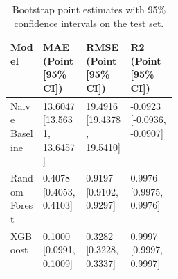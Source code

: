 \begin{table}[!t]
    \centering
    \caption{Bootstrap point estimates with 95\% confidence intervals on the test set.}
    \label{tab:bootstrap}
    \small
    \setlength{\tabcolsep}{4pt}
    \begin{tabular}{lllp{0.28\linewidth}}
        \toprule
        Model & MAE (Point [95\% CI]) & RMSE (Point [95\% CI]) & R2 (Point [95\% CI]) \\
        \midrule
        Naive Baseline & 13.6047 [13.5631, 13.6457] & 19.4916 [19.4378, 19.5410] & -0.0923 [-0.0936, -0.0907] \\
        Random Forest & 0.4078 [0.4053, 0.4103] & 0.9197 [0.9102, 0.9297] & 0.9976 [0.9975, 0.9976] \\
        XGBoost & 0.1000 [0.0991, 0.1009] & 0.3282 [0.3228, 0.3337] & 0.9997 [0.9997, 0.9997] \\
        \bottomrule
    \end{tabular}
\end{table}
